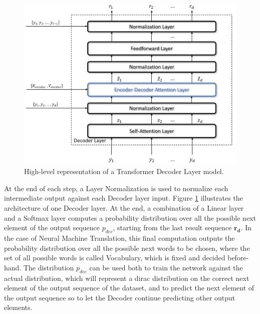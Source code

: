                 \begin{figure}[!t]
                    \centering
                    \includegraphics[width=15cm, keepaspectratio]{images/an/transformer_decoder.png}
                    \caption{High-level representation of a Transformer Decoder Layer model.}
                    \label{fig:an_transformer_decoder}
                \end{figure}
                
                At the end of each step, a Layer Normalization is used to normalize each intermediate output against each Decoder layer input. Figure \ref{fig:an_transformer_decoder} illustrates the architecture of one Decoder layer. \newline
                At the end, a combination of a Linear layer and a Softmax layer computes a probability distribution over all the possible next element of the output sequence $p_{dec}$, starting from the last result sequence $\mathbf{r_d}$. In the case of Neural Machine Translation, this final computation outputs the probability distribution over all the possible next words to be chosen, where the set of all possible words is called Vocabulary, which is fixed and decided before-hand. \newline
                The distribution $p_{dec}$ can be used both to train the network against the actual distribution, which will represent a dirac distribution on the correct next element of the output sequence of the dataset, and to predict the next element of the output sequence so to let the Decoder continue predicting other output elements.
                
